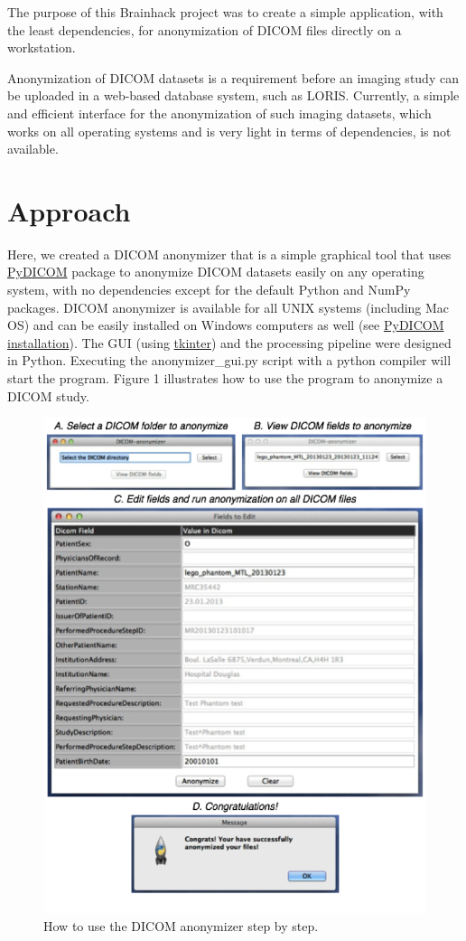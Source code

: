 \documentclass[twocolumn]{bmcart}%
\begin{document}
The purpose of this Brainhack project was to create a simple
application, with the least dependencies, for anonymization of DICOM
files directly on a workstation.

Anonymization of DICOM datasets is a requirement before an imaging study
can be uploaded in a web-based database system, such as
LORIS\cite{Das2011}. Currently, a simple and efficient interface for the
anonymization of such imaging datasets, which works on all operating
systems and is very light in terms of dependencies, is not available.

\section{Approach}\label{approach}

Here, we created a DICOM anonymizer that is a simple graphical tool that
uses \href{https://github.com/darcymason/pydicom}{PyDICOM} package to
anonymize DICOM datasets easily on any operating system, with no
dependencies except for the default Python and NumPy packages. DICOM
anonymizer is available for all UNIX systems (including Mac OS) and can
be easily installed on Windows computers as well (see
\href{http://pydicom.readthedocs.org/en/latest/getting_started.html}{PyDICOM
installation}). The GUI (using
\href{https://wiki.python.org/moin/TkInter}{tkinter}) and the processing
pipeline were designed in Python. Executing the anonymizer\_gui.py
script with a python compiler will start the program. Figure 1
illustrates how to use the program to anonymize a DICOM study.

\begin{figure}[h!]
  \includegraphics[width=.47\textwidth]{loris_screenshot.png}
  \caption{\label{centfig} How to use the DICOM anonymizer step by step.}
\end{figure}
\end{document}
